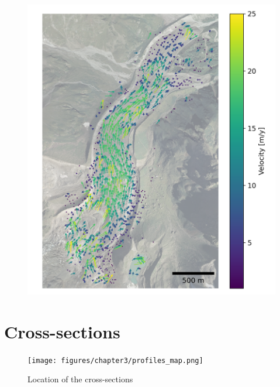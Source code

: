 \begin{figure}
    \centering
    \includegraphics[width=\textwidth]{figures/chapter3/velocity_DIC_2016-2017.png}
\end{figure}


\chapter{Cross-sections}\label{app:xsec}

\begin{figure}[p]
    \centering
    \texttt{[image: figures/chapter3/profiles\_map.png]}\\
    \caption{Location of the cross-sections}
\end{figure}

